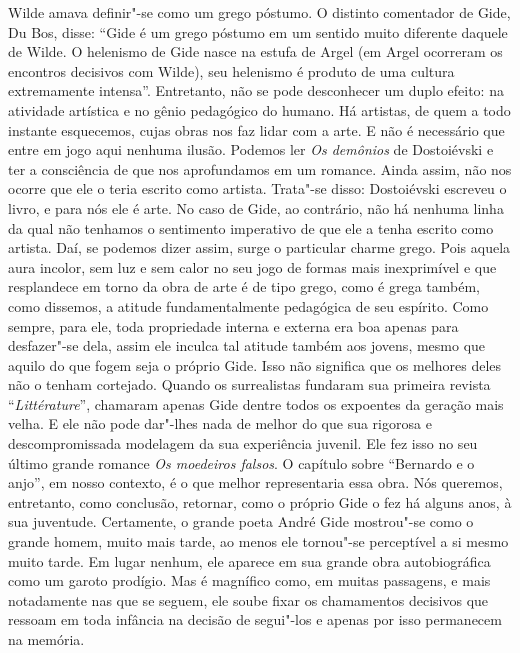 Wilde amava definir"-se como um grego póstumo. O distinto comentador de
Gide, Du Bos, disse: ``Gide é um grego póstumo em um sentido muito
diferente daquele de Wilde. O helenismo de Gide nasce na estufa de Argel
(em Argel ocorreram os encontros decisivos com Wilde), seu helenismo é
produto de uma cultura extremamente intensa''. Entretanto, não se pode
desconhecer um duplo efeito: na atividade artística e no gênio pedagógico
do humano. Há artistas, de quem a todo instante esquecemos, cujas
obras nos faz lidar com a arte. E não é necessário que entre em jogo
aqui nenhuma ilusão. Podemos ler \emph{Os demônios} de Dostoiévski e ter
a consciência de que nos aprofundamos em um romance. Ainda assim, não
nos ocorre que ele o teria escrito como artista. Trata"-se disso:
Dostoiévski escreveu o livro, e para nós ele é arte. No caso de Gide, ao
contrário, não há nenhuma linha da qual não tenhamos o sentimento
imperativo de que ele a tenha escrito como artista. Daí, se podemos dizer
assim, surge o particular charme grego. Pois aquela aura incolor, sem luz e sem
calor no seu jogo de formas mais inexprimível e que resplandece em torno da
obra de arte é de tipo grego, como é grega também, como dissemos, a atitude
fundamentalmente pedagógica de seu espírito. Como sempre, para ele, toda
propriedade interna e externa era boa apenas para desfazer"-se dela,
assim ele inculca tal atitude também aos jovens, mesmo que aquilo do que
fogem seja o próprio Gide. Isso não significa que os melhores deles não o
tenham cortejado. Quando os surrealistas fundaram sua primeira revista
``\emph{Littérature}'', chamaram apenas Gide dentre todos os expoentes
da geração mais velha. E ele não pode dar"-lhes nada de melhor do que sua
rigorosa e descompromissada modelagem da sua experiência juvenil. Ele fez isso
no seu último grande romance \emph{Os moedeiros falsos}. O
capítulo sobre ``Bernardo e o anjo'', em nosso contexto, é o que melhor
representaria essa obra. Nós queremos, entretanto, como conclusão,
retornar, como o próprio Gide o fez há alguns anos, à sua juventude.
Certamente, o grande poeta André Gide mostrou"-se como o grande homem,
muito mais tarde, ao menos ele tornou"-se perceptível a si mesmo muito
tarde. Em lugar nenhum, ele aparece em sua grande obra autobiográfica
como um garoto prodígio. Mas é magnífico como, em muitas passagens,
e mais notadamente nas que se seguem, ele soube fixar os chamamentos
decisivos que ressoam em toda infância na decisão de segui"-los e
apenas por isso permanecem na memória.

